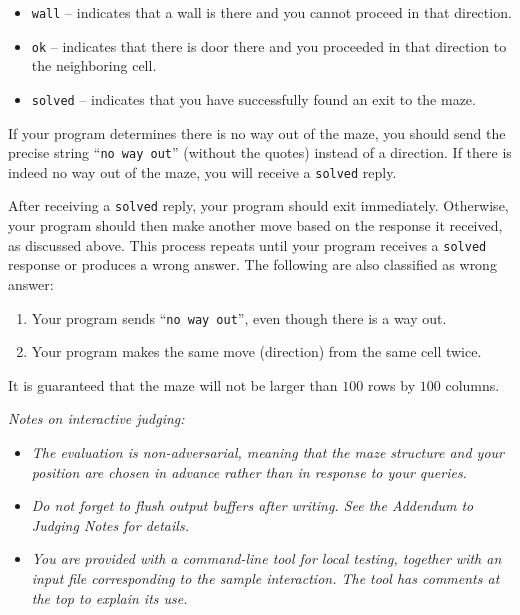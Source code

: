 \vspace{-8pt}
\begin{itemize}
\itemsep=-2pt
\item \texttt{wall} -- indicates that a wall is there and you cannot proceed in that direction.
\item \texttt{ok} -- indicates that there is door there and you proceeded in that direction to the neighboring cell.
\item \texttt{solved} -- indicates that you have successfully found an exit to the maze.
\end{itemize}

If your program determines there is no way out of the maze, you should send the precise string ``\texttt{no way out}'' 
(without the quotes) instead of a direction.
If there is indeed no way out of the maze, you will receive a
\texttt{solved} reply.

After receiving a \texttt{solved} reply, your program should exit immediately.
Otherwise, your program should then make another move based on the response it received, as discussed above. 
This process repeats until your program receives a \texttt{solved} response or produces
a wrong answer. The following are also classified as wrong answer:

\vspace{-8pt}
\begin{enumerate}
\itemsep=-2pt
\item Your program sends ``\texttt{no way out}'', even though there is a way out.
\item Your program makes the same move (direction) from the same cell twice.
\end{enumerate}

It is guaranteed that the maze will not be larger than $100$ rows by $100$ columns.

\emph{Notes on interactive judging:}
\vspace{-8pt}
\begin{itemize}
\itemsep=-2pt
\item \emph{The evaluation is non-adversarial, meaning that the maze structure and your position are chosen
in advance rather than in response to your queries.}
\item \emph{Do not forget to flush output buffers after writing. See the Addendum to Judging Notes for details.}
\item \emph{You are provided with a command-line tool for local testing, together with an input file
corresponding to the sample interaction.
The tool has comments at the top to explain its use.}
\end{itemize}

